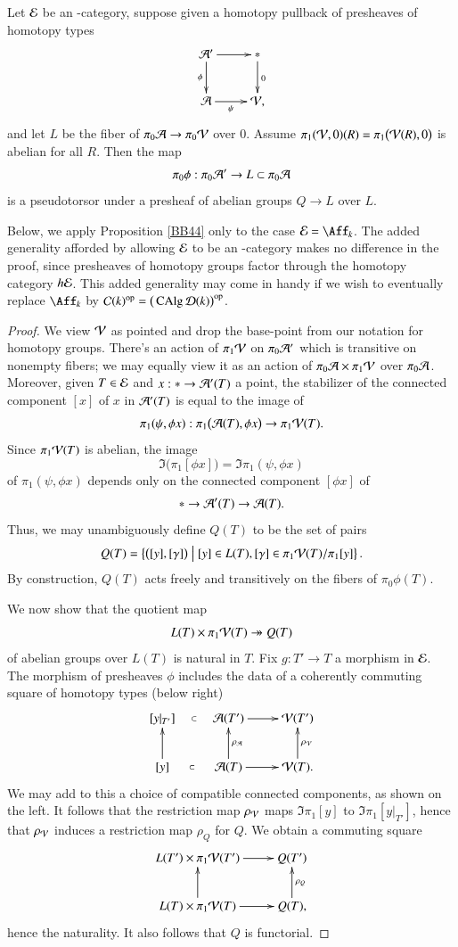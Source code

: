\begin{ssProposition}
\label{BB44}
Let $\mathcal{E}$ be an \oo-category, suppose given a homotopy pullback of presheaves of homotopy types
\[
\xymatrix{
\Aa' \ar[d]_-{\phi} \ar[r]
&
\ast \ar[d]^{0}
\\
\Aa \ar[r]_-{\psi}
&
\Vv,
}
\]
and let $L$ be the fiber of $\pi_0 \mathcal{A} \to \pi_0 \mathcal{V}$ over $0$. Assume $\pi_1(\mathcal{V},0)(R)=\pi_1\big(\mathcal{V}(R),0\big)$ is abelian for all $R$.  Then the map
\[
\pi_0 \phi: \pi_0 \mathcal{A}' \to L \subset \pi_0 \mathcal{A}
\]
is a pseudotorsor under a presheaf of abelian groups $Q \to L$ over $L$.
\end{ssProposition}

\begin{ssRemark}
Below, we apply Proposition \ref{BB44} only to the case $\Ee = \Aff_k$. The added generality afforded by allowing $\mathcal{E}$ to be an \oo-category makes no difference in the proof, since presheaves of homotopy groups factor through the homotopy category $h\mathcal{E}$. This added generality may come in handy if we wish to eventually replace $\Aff_k$ by $\mathcal{C}(k)^{\mathrm{op}} = \big(\operatorname{CAlg} \mathcal{D}(k)\big)^{\mathrm{op}}$.
\end{ssRemark}

\begin{proof}
We view $\mathcal{V}$ as pointed and drop the base-point from our notation for homotopy groups. There's an action of $\pi_1 \mathcal{V}$ on $\pi_0 \mathcal{A}'$ which is transitive on nonempty fibers; we may equally view it as an action of $\pi_0 \mathcal{A} \times \pi_1 \mathcal{V}$ over $\pi_0 \mathcal{A}$. Moreover, given $T \in \mathcal{E}$ and $x: \ast \to \mathcal{A}'(T)$ a point, the stabilizer of the connected component $[x]$ of $x$ in $\mathcal{A}'(T)$ is equal to the image of 
\[
\pi_1(\psi ,\phi x): \pi_1 \big( \mathcal{A}(T), \phi x \big) \to \pi_1 \mathcal{V}(T).
\] 
Since $\pi_1 \mathcal{V}(T)$ is abelian, the image
\[
\Im \big( \pi_1 [\phi x] \big)  = \Im \pi_1(\psi, \phi x)
\]
of $\pi_1(\psi, \phi x)$ depends only on the connected component $[\phi x]$ of
\[
\ast \to \mathcal{A}'(T) \to \mathcal{A}(T).
\]
Thus, we may unambiguously define $Q(T)$ to be the set of pairs
\[
Q(T) = 
\left\{ \big([y], [\gamma]\big) \; \middle| \;  [y] \in L(T), 
[\gamma] \in \pi_1 \mathcal{V}(T) / \pi_1[y] \right\}.
\]
By construction, $Q(T)$ acts freely and transitively on the fibers of $\pi_0 \phi(T)$. 

We now show that the quotient map
\[
L (T) \times \pi_1 \mathcal{V}(T) 
\twoheadrightarrow Q(T)
\]
of abelian groups over $L(T)$ is natural in $T$. Fix $g: T' \to T$ a morphism in $\mathcal{E}$. The morphism of presheaves $\phi$ includes the data of a coherently commuting square of homotopy types (below right)
\[
\xymatrix{
[y|_{T'}] \ar@{}[r]|-\subset & 
\Aa(T') \ar[r] & \Vv(T')
\\
[y] \ar@{}[r]|-\subset \ar[u] & 
\Aa(T) \ar[u]_-{\rho_\Aa} \ar[r] & \Vv(T). \ar[u]_-{\rho_\Vv}
}
\]
We may add to this a choice of compatible connected components, as shown on the left. It follows that the restriction map $\rho_{\mathcal{V}}$ maps $\Im \pi_1[y]$ to $\Im \pi_1 [y|_{T'}]$, hence that $\rho_{\mathcal{V}}$ induces a restriction map $\rho_Q$ for $Q$. We obtain a commuting square
\[
\xymatrix{
L(T') \times \pi_1\Vv(T') \ar[r] & Q(T')
\\
L(T) \times \pi_1\Vv(T) \ar[u] \ar[r] & 
Q(T) \ar[u]_-{\rho_Q},
}
\]
hence the naturality. It also follows that $Q$ is functorial. 
\end{proof}



